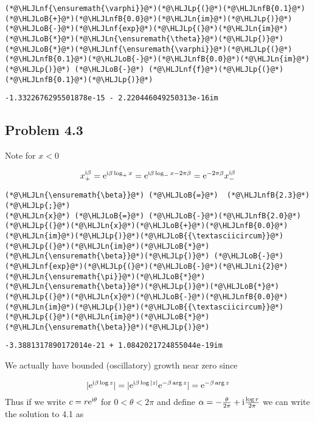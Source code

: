 \documentclass[12pt,landscape]{article}
\newcommand{\HLJLn}[1]{#1}
\newcommand{\HLJLnf}[1]{\textcolor[RGB]{66,102,213}{#1}}
\newcommand{\HLJLnfB}[1]{\textcolor[RGB]{59,151,46}{#1}}
\newcommand{\HLJLni}[1]{\textcolor[RGB]{59,151,46}{#1}}
\newcommand{\HLJLoB}[1]{\textcolor[RGB]{102,102,102}{\textbf{#1}}}
\newcommand{\HLJLp}[1]{#1}
\def\I{ {\rm i} }
\def\E{ {\rm e} }
\begin{document}
{\begin{lstlisting}
(*@\HLJLnf{\ensuremath{\varphi}}@*)(*@\HLJLp{(}@*)(*@\HLJLnfB{0.1}@*)(*@\HLJLoB{+}@*)(*@\HLJLnfB{0.0}@*)(*@\HLJLn{im}@*)(*@\HLJLp{)}@*)(*@\HLJLoB{-}@*)(*@\HLJLnf{exp}@*)(*@\HLJLp{(}@*)(*@\HLJLn{im}@*)(*@\HLJLoB{*}@*)(*@\HLJLn{\ensuremath{\theta}}@*)(*@\HLJLp{)}@*)(*@\HLJLoB{*}@*)(*@\HLJLnf{\ensuremath{\varphi}}@*)(*@\HLJLp{(}@*)(*@\HLJLnfB{0.1}@*)(*@\HLJLoB{-}@*)(*@\HLJLnfB{0.0}@*)(*@\HLJLn{im}@*)(*@\HLJLp{)}@*) (*@\HLJLoB{-}@*) (*@\HLJLnf{f}@*)(*@\HLJLp{(}@*)(*@\HLJLnfB{0.1}@*)(*@\HLJLp{)}@*)
\end{lstlisting}

\begin{lstlisting}
-1.3322676295501878e-15 - 2.220446049250313e-16im
\end{lstlisting}


\subsection{Problem 4.3}
Note for $x < 0$

\[
x_+^{\I \beta} = \E^{\I \beta \log_+ x} = \E^{\I \beta \log_- x - 2\pi \beta} = \E^{-2 \pi \beta} x_-^{\I \beta}
\]

\begin{lstlisting}
(*@\HLJLn{\ensuremath{\beta}}@*) (*@\HLJLoB{=}@*)  (*@\HLJLnfB{2.3}@*)(*@\HLJLp{;}@*)
(*@\HLJLn{x}@*) (*@\HLJLoB{=}@*) (*@\HLJLoB{-}@*)(*@\HLJLnfB{2.0}@*)
(*@\HLJLp{(}@*)(*@\HLJLn{x}@*)(*@\HLJLoB{+}@*)(*@\HLJLnfB{0.0}@*)(*@\HLJLn{im}@*)(*@\HLJLp{)}@*)(*@\HLJLoB{{\textasciicircum}}@*)(*@\HLJLp{(}@*)(*@\HLJLn{im}@*)(*@\HLJLoB{*}@*)(*@\HLJLn{\ensuremath{\beta}}@*)(*@\HLJLp{)}@*) (*@\HLJLoB{-}@*) (*@\HLJLnf{exp}@*)(*@\HLJLp{(}@*)(*@\HLJLoB{-}@*)(*@\HLJLni{2}@*)(*@\HLJLn{\ensuremath{\pi}}@*)(*@\HLJLoB{*}@*)(*@\HLJLn{\ensuremath{\beta}}@*)(*@\HLJLp{)}@*)(*@\HLJLoB{*}@*)(*@\HLJLp{(}@*)(*@\HLJLn{x}@*)(*@\HLJLoB{-}@*)(*@\HLJLnfB{0.0}@*)(*@\HLJLn{im}@*)(*@\HLJLp{)}@*)(*@\HLJLoB{{\textasciicircum}}@*)(*@\HLJLp{(}@*)(*@\HLJLn{im}@*)(*@\HLJLoB{*}@*)(*@\HLJLn{\ensuremath{\beta}}@*)(*@\HLJLp{)}@*)
\end{lstlisting}

\begin{lstlisting}
-3.3881317890172014e-21 + 1.0842021724855044e-19im
\end{lstlisting}


We actually have bounded (oscillatory) growth near zero since

\[
|\E^{\I \beta \log z}| = |\E^{\I \beta \log |z|} \E^{-\beta \arg z}| = \E^{-\beta \arg z}
\]
Thus if we write $c = r \E^{\I \theta}$ for $0 < \theta < 2 \pi$ and define $\alpha = -{\theta \over 2 \pi} + \I{\log r \over 2 \pi}$ we can write the solution to 4.1 as

}
\end{document}
